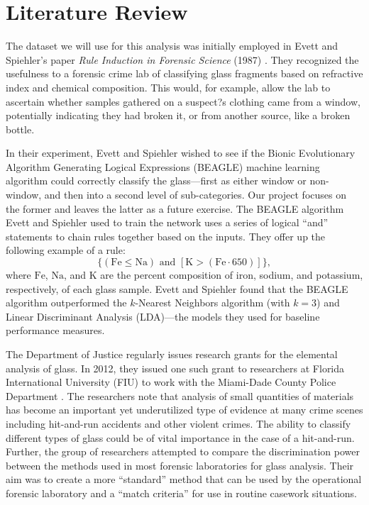 \documentclass[12pt,halfline,a4paper]{ouparticle}
\begin{document}
\section{Literature Review}
\label{sec2}
The dataset we will use for this analysis was initially employed in Evett and Spiehler's paper \emph{Rule Induction in Forensic Science} (1987) \cite{evett1987}. They recognized the usefulness to a forensic crime lab of classifying glass fragments based on refractive index and chemical composition. This would, for example, allow the lab to ascertain whether samples gathered on a suspect?s clothing came from a window, potentially indicating they had broken it, or from another source, like a broken bottle. 

In their experiment, Evett and Spiehler wished to see if the Bionic Evolutionary Algorithm Generating Logical Expressions (BEAGLE) machine learning algorithm could correctly classify the glass---first as either window or non-window, and then into a second level of sub-categories. Our project focuses on the former and leaves the latter as a future exercise. The BEAGLE algorithm Evett and Spiehler used to train the network uses a series of logical ``and'' statements to chain rules together based on the inputs. They offer up the following example of a rule: 
\begin{equation}
\{(\mathrm{Fe} \leq \mathrm{Na}) \text{ and } [\mathrm{K} > (\mathrm{Fe} \cdot 650)]\}, 
\end{equation}
where $\mathrm{Fe}$, $\mathrm{Na}$, and $\mathrm{K}$ are the percent composition of iron, sodium, and potassium, respectively, of each glass sample. Evett and Spiehler found that the BEAGLE algorithm outperformed the $k$-Nearest Neighbors algorithm (with $ k = 3$) and Linear Discriminant Analysis (LDA)---the models they used for baseline performance measures. 

The Department of Justice regularly issues research grants for the elemental analysis of glass. In 2012, they issued one such grant to researchers at Florida International University (FIU) to work with the Miami-Dade County Police Department \cite{almirall2012}. The researchers note that analysis of small quantities of materials has become an important yet underutilized type of evidence at many crime scenes including hit-and-run accidents and other violent crimes. The ability to classify different types of glass could be of vital importance in the case of a hit-and-run. Further, the group of researchers attempted to compare the discrimination power between the methods used in most forensic laboratories for glass analysis. Their aim was to create a more ``standard'' method that can be used by the operational forensic laboratory and a ``match criteria'' for use in routine casework situations.
\end{document}

